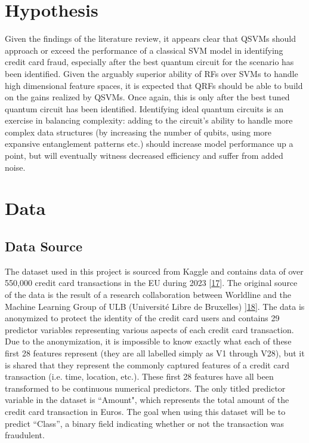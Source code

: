 \documentclass[11pt, oneside]{article}   	%
\begin{document}
\section{Hypothesis}

Given the findings of the literature review, it appears clear that QSVMs should approach or exceed the performance of a classical SVM model in identifying credit card fraud, especially after the best quantum circuit for the scenario has been identified. Given the arguably superior ability of RFs over SVMs to handle high dimensional feature spaces, it is expected that QRFs should be able to build on the gains realized by QSVMs. Once again, this is only after the best tuned quantum circuit has been identified. Identifying ideal quantum circuits is an exercise in balancing complexity: adding to the circuit's ability to handle more complex data structures (by increasing the number of qubits, using more expansive entanglement patterns etc.) should increase model performance up a point, but will eventually witness decreased efficiency and suffer from added noise. 




\section{Data}
\subsection{Data Source}

The dataset used in this project is sourced from Kaggle and contains data of over 550,000 credit card transactions in the EU during 2023 [\href{https://www.kaggle.com/datasets/nelgiriyewithana/credit-card-fraud-detection-dataset-2023}{17}]. The original source of the data is the result of a research collaboration between Worldline and the Machine Learning Group of ULB (Université Libre de Bruxelles) ]\href{https://www.researchgate.net/publication/283349138_Calibrating_Probability_with_Undersampling_for_Unbalanced_Classification}{18}]. The data is anonymized to protect the identity of the credit card users and contains 29 predictor variables representing various aspects of each credit card transaction.  Due to the anonymization, it is impossible to know exactly what each of these first 28 features represent (they are all labelled simply as V1 through V28), but it is shared that they represent the commonly captured features of a credit card transaction (i.e. time, location, etc.). These first 28 features have all been transformed to be continuous numerical predictors. The only titled predictor variable in the dataset is ``Amount", which represents the total amount of the credit card transaction in Euros. The goal when using this dataset will be to predict ``Class”, a binary field indicating whether or not the transaction was fraudulent.
\end{document}
